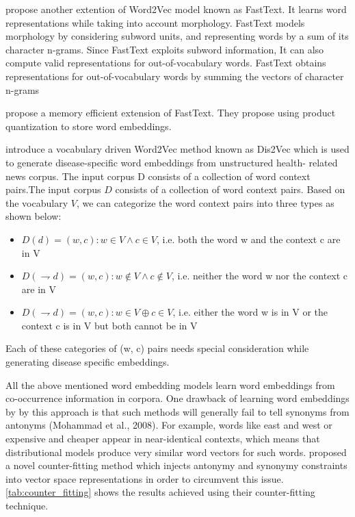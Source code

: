  \cite{bojanowski2016enriching} propose another extention of Word2Vec model known as FastText. It learns word
 representations while taking into account morphology.
 FastText models morphology by considering subword
 units, and representing words by a sum of its character
 n-grams.  Since FastText exploits subword information, It can also
 compute valid representations for out-of-vocabulary
 words. FastText obtains representations for out-of-vocabulary words by summing the vectors of character
 n-grams
 
 \cite{joulin2016fasttext} propose a memory efficient extension of FastText. They propose using product quantization to store word embeddings.
 
 \cite{ghosh2016characterizing} introduce a vocabulary driven Word2Vec method known as Dis2Vec which is
 used to generate disease-specific word embeddings from unstructured health-
 related news corpus. The input corpus D consists of a collection of word context pairs.The input corpus $D$ consists of a collection of word context pairs. Based on the vocabulary $ V$, we can categorize the word context pairs into three types as shown
 below:
 \\
 \begin{itemize}
 	\item $ D(d) = {(w, c): w \in V ∧c \in V }$, i.e. both the word w and the context c are in V
 	\item $D(\rightharpoondown d) = {(w, c): w \notin V ∧c \notin V }$, i.e. neither the word w nor the context c are in V
 	\item $D(\rightharpoondown d) = {(w, c): w \in V \oplus c \in V }$, i.e. either the word w is in V or the context c is in V but both cannot be in V
 \end{itemize}
 
 Each of these categories of (w, c) pairs
 needs special consideration while generating disease specific embeddings.
 
 
 All the above mentioned word embedding models learn word embeddings from co-occurrence information in corpora.
 One drawback of learning word embeddings by by this approach is that such methods will generally fail to tell synonyms from
 antonyms (Mohammad et al., 2008). For example, words like east and west
 or expensive and cheaper appear in near-identical contexts, which means
 that distributional models produce very similar word vectors for such words.
 \cite{mrksic:2016:naacl} proposed a novel counter-fitting method which injects antonymy and
 synonymy constraints into vector space representations in order to circumvent this issue.\ref{tab:counter_fitting} shows the results \cite{mrksic:2016:naacl} achieved using their counter-fitting technique.
 
